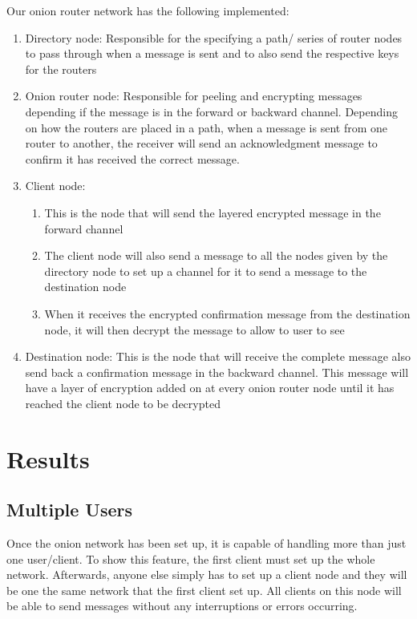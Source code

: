 \documentclass[10pt]{report}
\begin{document}
Our onion router network has the following implemented:
\begin{enumerate}
    \item Directory node: Responsible for the specifying a path/ series of router nodes to pass through when a message is sent and to also send the respective keys for the routers
    \item Onion router node: Responsible for peeling and encrypting messages depending if the message is in the forward or backward channel. Depending on how the routers are placed in a path, when a message is sent from one router to another, the receiver will send an acknowledgment message to confirm it has received the correct message.
    \item Client node:
    \begin{enumerate}
        \item This is the node that will send the layered encrypted message in the forward channel
        \item The client node will also send a message to all the nodes given by the directory node to set up a channel for it to send a message to the destination node
        \item When it receives the encrypted confirmation message from the destination node, it will then decrypt the message to allow to user to see
    \end{enumerate}
    \item Destination node: This is the node that will receive the complete message also send back a confirmation message in the backward channel. This message will have a layer of encryption added on at every onion router node until it has reached the client node to be decrypted
\end{enumerate}

\chapter{Results}
\section{Multiple Users}
    Once the onion network has been set up, it is capable of handling more than just one user/client. To show this feature, the first client must set up the whole network. Afterwards, anyone else simply has to set up a client node and they will be one the same network that the first client set up. All clients on this node will be able to send messages without any interruptions or errors occurring.
\end{document}
